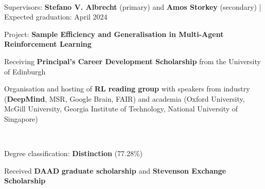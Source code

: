 \documentclass[]{lukas-cv-openfont}
\begin{document}


\vspace{1em}


\noindent
{}
\\
\begin{tightitemize}{1.7em}
    \item Supervisors: \textbf{Stefano V. Albrecht} (primary) and \textbf{Amos Storkey} (secondary) | Expected graduation: April 2024
    \item Project: \textbf{Sample Efficiency and Generalisation in Multi-Agent Reinforcement Learning}
    \item Receiving \textbf{Principal's Career Development Scholarship} from the University of Edinburgh
    \item Organisation and hosting of \textbf{RL reading group} with speakers from industry (\textbf{DeepMind}, MSR, Google Brain, FAIR) and academia (Oxford University, McGill University, Georgia Institute of Technology, National University of Singapore)
\end{tightitemize}
\largesectionsep

\noindent
{}
\\
\begin{tightitemize}{1.7em}
    \item Degree classification: \textbf{Distinction} (77.28\%)
    \item Received \textbf{DAAD} \textbf{graduate scholarship} and \textbf{Stevenson Exchange Scholarship} 
\end{tightitemize}
\largesectionsep
\end{document}
